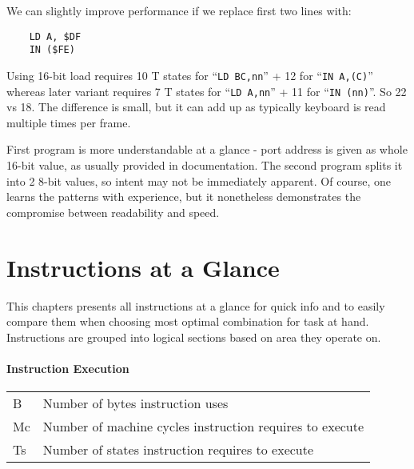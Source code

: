 \documentclass[12pt,twoside,openright,a4paper]{book}
\newcommand{\notet}{\rule{0pt}{2.4ex}}
\begin{document}
We can slightly improve performance if we replace first two lines with:

\begin{Verbatim}
	LD A, $DF
	IN ($FE)
\end{Verbatim}

Using 16-bit load requires 10 T states for ``{\tt LD BC,nn}'' + 12 for ``{\tt IN A,(C)}'' whereas later variant requires 7 T states for ``{\tt LD A,nn}'' + 11 for ``{\tt IN (nn)}''. So 22 vs 18. The difference is small, but it can add up as typically keyboard is read multiple times per frame.

First program is more understandable at a glance - port address is given as whole 16-bit value, as usually provided in documentation. The second program splits it into 2 8-bit values, so intent may not be immediately apparent. Of course, one learns the patterns with experience, but it nonetheless demonstrates the compromise between readability and speed.



\chapter{Instructions at a Glance}

This chapters presents all instructions at a glance for quick info and to easily compare them when choosing most optimal combination for task at hand. Instructions are grouped into logical sections based on area they operate on.

\minitoc

\pagebreak

\newcommand{\FS}{$\updownarrow$} %
\newcommand{\FN}{-} %
\newcommand{\FU}{?} %
\newcommand{\FX}{$\bullet$}
\newcommand{\FPV}{VF} %
\newcommand{\FPP}{PF} %

\subsubsection{Instruction Execution}

\begin{tabular}{ll}
	B & 
		Number of bytes instruction uses \\
	Mc\notet & 
		Number of machine cycles instruction requires to execute \\
	Ts\notet & 
		Number of states instruction requires to execute \\
\end{tabular}
\end{document}
